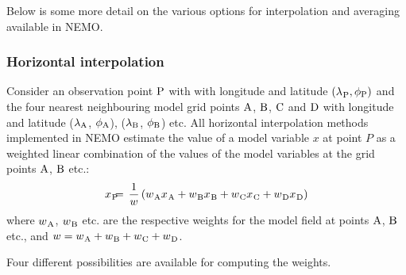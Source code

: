 \documentclass[../tex_main/NEMO_manual]{subfiles}
\begin{document}
Below is some more detail on the various options for interpolation and averaging available in NEMO.

\subsubsection{Horizontal interpolation}
Consider an observation point ${\rm P}$ with 
with longitude and latitude $({\lambda_{}}_{\rm P}, \phi_{\rm P})$ and the 
four nearest neighbouring model grid points ${\rm A}$, ${\rm B}$, ${\rm C}$ 
and ${\rm D}$ with longitude and latitude ($\lambda_{\rm A}$, $\phi_{\rm A}$),
($\lambda_{\rm B}$, $\phi_{\rm B}$) etc.
All horizontal interpolation methods implemented in NEMO
estimate the value of a model variable $x$ at point $P$ as
a weighted linear combination of the values of the model 
variables at the grid points ${\rm A}$, ${\rm B}$ etc.:
\begin{eqnarray}
{x_{}}_{\rm P} & \hspace{-2mm} = \hspace{-2mm} & 
\frac{1}{w} \left( {w_{}}_{\rm A} {x_{}}_{\rm A} + 
                   {w_{}}_{\rm B} {x_{}}_{\rm B} + 
                   {w_{}}_{\rm C} {x_{}}_{\rm C} + 
                   {w_{}}_{\rm D} {x_{}}_{\rm D} \right)
\end{eqnarray}
where ${w_{}}_{\rm A}$, ${w_{}}_{\rm B}$ etc. are the respective weights for the 
model field at points ${\rm A}$, ${\rm B}$ etc., and 
$w = {w_{}}_{\rm A} + {w_{}}_{\rm B} + {w_{}}_{\rm C} + {w_{}}_{\rm D}$.

Four different possibilities are available for computing the weights.
\end{document}
